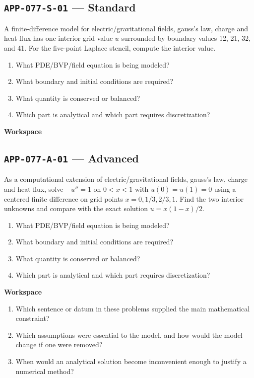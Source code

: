\documentclass[11pt]{book}
\newcommand{\pid}[1]{\texttt{#1}}
\newcommand{\workspace}{\par\vspace{0.7in}\hrulefill\par\vspace{0.55in}\hrulefill\par}
\begin{document}
\subsection*{\pid{APP-077-S-01} — Standard}
\begin{problembox}
A finite-difference model for electric/gravitational fields, gauss's law, charge and heat flux has one interior grid value $u$ surrounded by boundary values 12, 21, 32, and 41. For the five-point Laplace stencil, compute the interior value.
\end{problembox}
\begin{promptbox}\begin{enumerate}
\item What PDE/BVP/field equation is being modeled?
\item What boundary and initial conditions are required?
\item What quantity is conserved or balanced?
\item Which part is analytical and which part requires discretization?
\end{enumerate}\end{promptbox}
\textbf{Workspace}\workspace
{}
\subsection*{\pid{APP-077-A-01} — Advanced}
\begin{problembox}
As a computational extension of electric/gravitational fields, gauss's law, charge and heat flux, solve $-u''=1$ on $0<x<1$ with $u(0)=u(1)=0$ using a centered finite difference on grid points $x=0,1/3,2/3,1$. Find the two interior unknowns and compare with the exact solution $u=x(1-x)/2$.
\end{problembox}
\begin{promptbox}\begin{enumerate}
\item What PDE/BVP/field equation is being modeled?
\item What boundary and initial conditions are required?
\item What quantity is conserved or balanced?
\item Which part is analytical and which part requires discretization?
\end{enumerate}\end{promptbox}
\textbf{Workspace}\workspace
\begin{reflectionbox}\begin{enumerate}
\item Which sentence or datum in these problems supplied the main mathematical constraint?
\item Which assumptions were essential to the model, and how would the model change if one were removed?
\item When would an analytical solution become inconvenient enough to justify a numerical method?
\end{enumerate}\end{reflectionbox}
\end{document}
